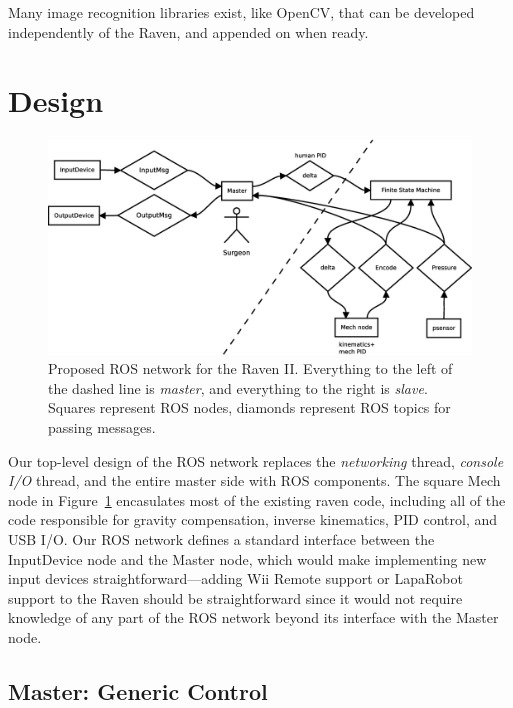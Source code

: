 \documentclass[letterpaper,twocolumn,10pt]{article}
\begin{document}
Many image recognition libraries exist, like OpenCV, that can be 
developed independently of the Raven, and appended on when ready.

\section{Design}

\begin{figure}[ht!]
  \begin{center}
    \includegraphics[width=1.0\textwidth]{ros_high_level_v2.eps}
  \end{center}
  \caption{Proposed ROS network for the Raven II. Everything to the
    left of the dashed line is \emph{master}, and everything to the
    right is \emph{slave}. Squares represent ROS nodes, diamonds
    represent ROS topics for passing messages.}
  \label{fig:ros_network}
\end{figure}

Our top-level design of the ROS network replaces the \emph{networking}
thread, \emph{console I/O} thread, and the entire master side with ROS
components. The square Mech node in Figure~\ref{fig:ros_network}
encasulates most of the existing raven code, including all of the code
responsible for gravity compensation, inverse kinematics, PID control,
and USB I/O. Our ROS network defines a standard interface between the
InputDevice node and the Master node, which would make implementing
new input devices straightforward---adding Wii Remote support or
LapaRobot support to the Raven should be straightforward since it
would not require knowledge of any part of the ROS network beyond its
interface with the Master node.

\subsection{Master: Generic Control}
\end{document}
